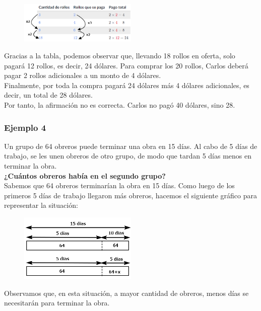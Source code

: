 \documentclass[11pt]{book}
\begin{document}
\begin{figure}[H]
  \centering
  \includegraphics[width=0.5\textwidth]{./Unidad 2/Images/tableS8L101.png}
\end{figure}

Gracias a la tabla, podemos observar que, llevando 18 rollos en oferta, solo pagará 12 rollos, es decir, 24 dólares. Para comprar los 20 rollos, Carlos deberá pagar 2 rollos adicionales a un monto de 4 dólares.\\

Finalmente, por toda la compra pagará 24 dólares más 4 dólares adicionales, es decir, un total de 28 dólares.\\

Por tanto, la afirmación no es correcta. Carlos no pagó 40 dólares, sino 28.

\subsubsection{Ejemplo 4}
Un grupo de 64 obreros puede terminar una obra en 15 días. Al cabo de 5 días de trabajo, se les unen obreros de otro grupo, de modo que tardan 5 días menos en terminar la obra.\\
\textbf{¿Cuántos obreros había en el segundo grupo?}\\

Sabemos que 64 obreros terminarían la obra en 15 días. Como luego de los primeros 5 días de trabajo llegaron más obreros, hacemos el siguiente gráfico para representar la situación:
\begin{figure}[H]
  \centering
  \includegraphics[width=0.5\textwidth]{./Unidad 2/Images/tableS8L103.png}
\end{figure}
Observamos que, en esta situación, a mayor cantidad de obreros, menos días se necesitarán para terminar la obra.\\
\end{document}
